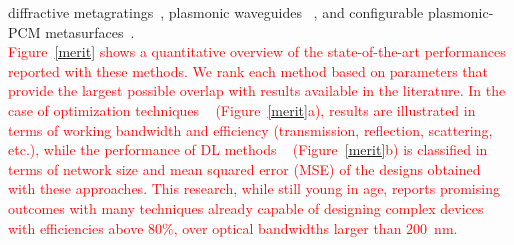 \documentclass[two-columns]{nature}
\newcommand{\rev}[1]{\textcolor{red}{#1}}
\begin{document}
diffractive metagratings~\cite{inampudi2018neural}, plasmonic waveguides ~\cite{zhang2019efficient},
and configurable plasmonic-PCM metasurfaces~\cite{kiarashinejad2020deep}.\\
\rev{Figure~\ref{merit}
shows a quantitative overview of the state-of-the-art performances reported with these methods. We rank each method based on parameters that provide the largest possible overlap with results available in the literature. In the case of optimization techniques ~\cite{borel2004topology,shen2014ultra, piggott2015inverse, shen2015integrated, frellsen2016topology,frandsen2016inverse, xiao2016diffractive, sell2017periodic, yu2017genetically,phan2019high}  (Figure~\ref{merit}a), results are illustrated in terms of working bandwidth
and efficiency (transmission, reflection, scattering, etc.), while the performance of DL methods ~\cite{inampudi2018neural,zhang2019efficient,liu2018generative,nadell2019deep,peurifoy2018nanophotonic,kiarashinejad2020deep,qu2019migrating,tahersima2018deep,malkiel2018plasmonic,liu2018training,explainable} (Figure~\ref{merit}b) is classified in terms of network size
and mean squared error (MSE) of the designs obtained with these approaches. This research, while still young in age, reports promising outcomes with many techniques already capable of designing complex devices with efficiencies above 80\%, over optical bandwidths larger than $200$~nm.}\\
\end{document}
